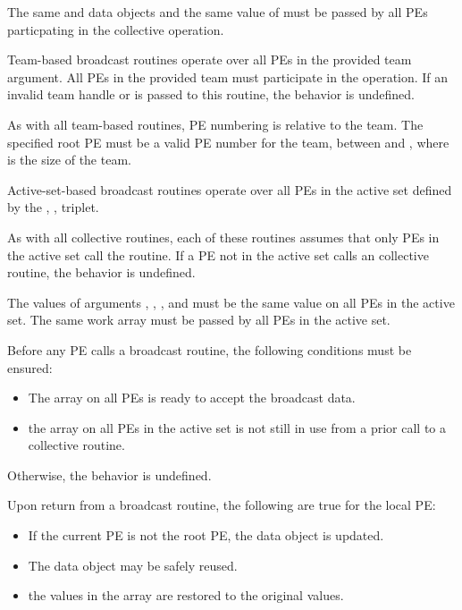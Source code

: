 \begin{apidefinition}
{    {\color{Green}
    The same \dest{} and \source{} data objects and the same value of  must be
    passed by all \acp{PE} particpating in the collective operation.

    Team-based broadcast routines operate over all \acp{PE} in the provided team argument. All
    \acp{PE} in the provided team must participate in the operation.
    If an invalid team handle or  is passed to this routine,
    the behavior is undefined.

    As with all team-based \openshmem routines, \ac{PE}
    numbering is relative to the team. The specified root \ac{PE} must be a valid \ac{PE}
    number for the team, between  and , where  is
    the size of the team.

    Active-set-based broadcast routines operate over all \acp{PE} in the active set
    defined by the , ,  triplet.
    }

    As with all  \oldtext{\openshmem} collective routines,
    each of these routines assumes that
    only \acp{PE} in the active set call the routine.  If a \ac{PE} not in the
    active set calls an  \oldtext{\openshmem}
    collective routine, the behavior is undefined.
    
    The values of arguments , , ,
    and  must be the same value on all \acp{PE} in the active set.
    The same  work array must be passed by all \acp{PE} in the active set.

    Before any \ac{PE} calls a broadcast routine, the following conditions must be ensured:
    \begin{itemize}
    \item The \dest{} array on all \acp{PE} 
      is ready to accept the broadcast data.
    \item {} the
       array on all \acp{PE} in the
      active set is not still in use from a prior call to a collective
      \openshmem routine.
    \end{itemize}
    Otherwise, the behavior is undefined.
    
    Upon return from a broadcast routine, the following are true for the local
    \ac{PE}:
    \begin{itemize}
    \item If the current \ac{PE} is not the root \ac{PE},
      the \dest{} data object is updated.
    \item The \source{} data object may be safely reused.
    \item {}
    the values in the  array are restored to the original values.
    \end{itemize}
}


\end{apidefinition}
